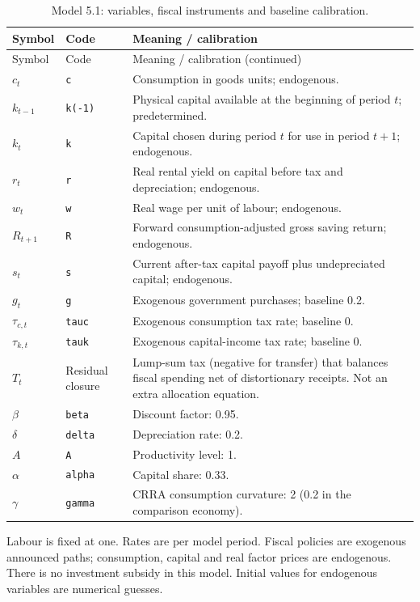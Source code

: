 \documentclass[12pt]{article}
\begin{document}
\begingroup
\small
\captionsetup{labelformat=empty}
\begin{longtable}{p{}p{}p{}}
\caption{Model 5.1: variables, fiscal instruments and baseline calibration.}\\
\hline
Symbol & Code & Meaning / calibration \\
\hline
\endfirsthead
Symbol & Code & Meaning / calibration (continued) \\
\hline
\endhead
$c_t$ & \texttt{c} & Consumption in goods units; endogenous. \\
$k_{t-1}$ & \texttt{k(-1)} & Physical capital available at the beginning of period $t$; predetermined. \\
$k_t$ & \texttt{k} & Capital chosen during period $t$ for use in period $t+1$; endogenous. \\
$r_t$ & \texttt{r} & Real rental yield on capital before tax and depreciation; endogenous. \\
$w_t$ & \texttt{w} & Real wage per unit of labour; endogenous. \\
$R_{t+1}$ & \texttt{R} & Forward consumption-adjusted gross saving return; endogenous. \\
$s_t$ & \texttt{s} & Current after-tax capital payoff plus undepreciated capital; endogenous. \\
$g_t$ & \texttt{g} & Exogenous government purchases; baseline 0.2. \\
$\tau_{c,t}$ & \texttt{tauc} & Exogenous consumption tax rate; baseline 0. \\
$\tau_{k,t}$ & \texttt{tauk} & Exogenous capital-income tax rate; baseline 0. \\
$T_t$ & Residual closure & Lump-sum tax (negative for transfer) that balances fiscal spending net of distortionary receipts. Not an extra allocation equation. \\
$\beta$ & \texttt{beta} & Discount factor: 0.95. \\
$\delta$ & \texttt{delta} & Depreciation rate: 0.2. \\
$A$ & \texttt{A} & Productivity level: 1. \\
$\alpha$ & \texttt{alpha} & Capital share: 0.33. \\
$\gamma$ & \texttt{gamma} & CRRA consumption curvature: 2 (0.2 in the comparison economy). \\
\hline
\end{longtable}
\noindent Labour is fixed at one. Rates are per model period. Fiscal policies are exogenous announced paths; consumption, capital and real factor prices are endogenous. There is no investment subsidy in this model. Initial values for endogenous variables are numerical guesses.
\endgroup
\end{document}

